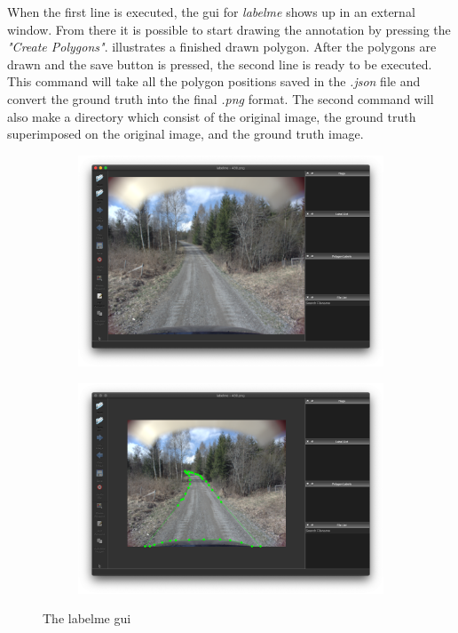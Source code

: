 \documentclass[USenglish]{ifimaster}  %
\begin{document}
When the first line is executed, the \ac{gui} for \textit{labelme} shows up in an external window. From there it is possible to start drawing the annotation by pressing the \textit{"Create Polygons"}.  illustrates a finished drawn polygon. After the polygons are drawn and the save button is pressed, the second line is ready to be executed. This command will take all the polygon positions saved in the \textit{.json} file and convert the ground truth into the final \textit{.png} format. The second command will also make a directory which consist of the original image, the ground truth superimposed on the original image, and the ground truth image. 

\begin{figure}[ht]
\begin{subfigure}{.6\textwidth}
\includegraphics[width=.75\linewidth]{bilder/labelme_gui.png}
\label{fig:gui}
\end{subfigure}
\hspace*{\fill} %
\begin{subfigure}{.6\textwidth}
\includegraphics[width=.75\linewidth]{bilder/annotating.png}
\label{fig:polygon}
\end{subfigure}
\caption{The labelme \ac{gui}}
\end{figure}
\end{document}
